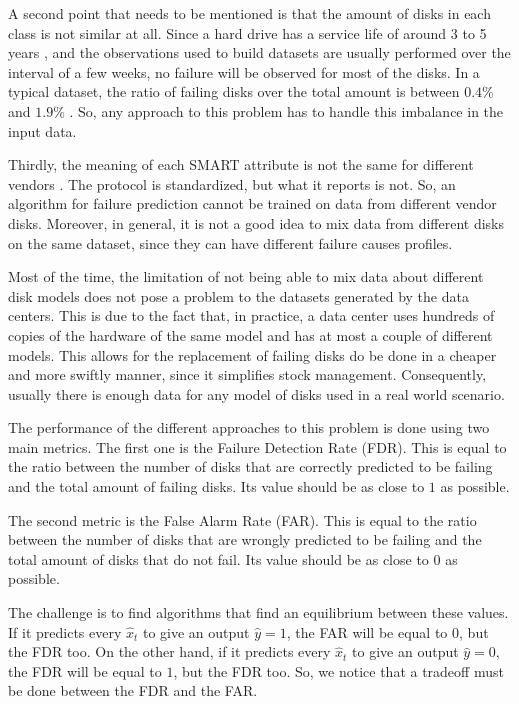 A second point that needs to be mentioned is that the amount of disks in each class is not similar at all.
Since a hard drive has a service life of around 3 to 5 years \cite{Vishwanath10}, and the observations used to build datasets are usually performed over the interval of a few weeks, no failure will be observed for most of the disks.
In a typical dataset, the ratio of failing disks over the total amount is between $0.4\%$ and $1.9\%$ \cite{Xu16}.
So, any approach to this problem has to handle this imbalance in the input data.

Thirdly, the meaning of each SMART attribute is not the same for different vendors \cite{SamsungSSD}.
The protocol is standardized, but what it reports is not.
So, an algorithm for failure prediction cannot be trained on data from different vendor disks.
Moreover, in general, it is not a good idea to mix data from different disks on the same dataset, since they can have different failure causes profiles.

Most of the time, the limitation of not being able to mix data about different disk models does not pose a problem to the datasets generated by the data centers.
This is due to the fact that, in practice, a data center uses hundreds of copies of the hardware of the same model and has at most a couple of different models.
This allows for the replacement of failing disks do be done in a cheaper and more swiftly manner, since it simplifies stock management.
Consequently, usually there is enough data for any model of disks used in a real world scenario.

The performance of the different approaches to this problem is done using two main metrics.
The first one is the Failure Detection Rate (FDR).
This is equal to the ratio between the number of disks that are correctly predicted to be failing and the total amount of failing disks.
Its value should be as close to $1$ as possible.

The second metric is the False Alarm Rate (FAR).
This is equal to the ratio between the number of disks that are wrongly predicted to be failing and the total amount of disks that do not fail.
Its value should be as close to $0$ as possible.

The challenge is to find algorithms that find an equilibrium between these values.
If it predicts every $\hat{x}_t$ to give an output $\hat{y} = 1$, the FAR will be equal to $0$, but the FDR too.
On the other hand, if it predicts every $\hat{x}_t$ to give an output $\hat{y} = 0$, the FDR will be equal to $1$, but the FDR too.
So, we notice that a tradeoff must be done between the FDR and the FAR.

